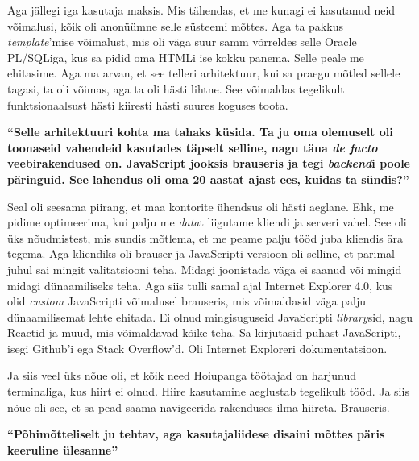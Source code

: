 Aga jällegi iga kasutaja maksis. Mis tähendas, et me kunagi ei kasutanud neid 
võimalusi, kõik oli anonüümne selle süsteemi mõttes. Aga ta pakkus 
\emph{template}'mise võimalust, mis oli väga suur samm võrreldes selle Oracle 
PL/SQLiga, kus sa pidid oma HTMLi ise kokku panema. Selle peale me ehitasime. 
Aga ma arvan, et see telleri arhitektuur, kui sa praegu mõtled sellele tagasi, 
ta oli võimas, aga ta oli hästi lihtne. See võimaldas tegelikult 
funktsionaalsust hästi kiiresti hästi suures koguses toota.

\textbf{\enquote{Selle arhitektuuri kohta ma tahaks küsida. Ta ju oma olemuselt 
oli toonaseid vahendeid kasutades täpselt selline, nagu täna \emph{de facto} 
veebirakendused on. JavaScript jooksis brauseris ja 
tegi \emph{backend}i poole päringuid. See lahendus oli oma 20 aastat ajast ees, 
kuidas ta sündis?}}

Seal oli seesama piirang, et maa kontorite ühendsus oli hästi aeglane. Ehk, me 
pidime optimeerima, kui palju me \emph{data}t liigutame kliendi ja serveri 
vahel. See oli üks nõudmistest, mis sundis mõtlema, et me peame palju tööd juba 
kliendis ära tegema. Aga kliendiks oli brauser ja JavaScripti versioon oli 
selline, et parimal juhul sai mingit valitatsiooni teha. Midagi joonistada väga 
ei saanud või mingid midagi dünaamiliseks teha. Aga siis tulli samal ajal 
Internet Explorer 4.0, kus olid \emph{custom} 
JavaScripti võimalusel brauseris, mis võimaldasid väga palju dünaamilisemat 
lehte ehitada. Ei olnud mingisuguseid JavaScripti \emph{library}sid, nagu 
Reactid ja muud, mis võimaldavad kõike teha. Sa kirjutasid puhast 
JavaScripti, isegi Github'i ega Stack Overflow'd. Oli Internet Exploreri 
dokumentatsioon.

Ja siis veel üks nõue oli, et kõik need Hoiupanga töötajad on harjunud 
terminaliga, kus  hiirt ei olnud. Hiire kasutamine aeglustab tegelikult tööd. 
Ja siis nõue oli see, et sa pead saama navigeerida rakenduses ilma hiireta. 
Brauseris. 

\textbf{\enquote{Põhimõtteliselt ju tehtav, aga kasutajaliidese disaini mõttes 
päris keeruline ülesanne}}

